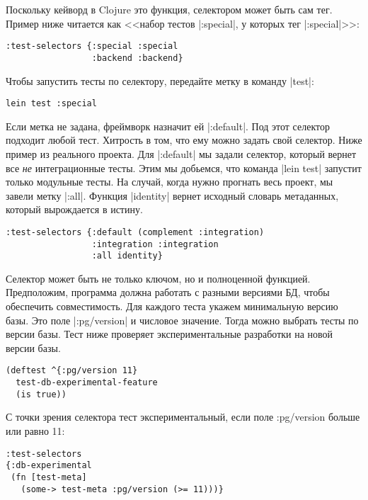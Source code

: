 Поскольку кейворд в Clojure это функция, селектором может быть сам тег. Пример
ниже читается как <<набор тестов \spverb|:special|, у которых тег
\spverb|:special|>>:

\begin{verbatim}
:test-selectors {:special :special
                 :backend :backend}
\end{verbatim}

Чтобы запустить тесты по селектору, передайте метку в команду \spverb|test|:

\begin{verbatim}
lein test :special
\end{verbatim}

Если метка не задана, фреймворк назначит ей \spverb|:default|. Под этот селектор
подходит любой тест. Хитрость в том, что ему можно задать свой селектор. Ниже
пример из реального проекта. Для \spverb|:default| мы задали селектор, который
вернет все \emph{не} интеграционные тесты. Этим мы добьемся, что команда
\spverb|lein test| запустит только модульные тесты. На случай, когда нужно
прогнать весь проект, мы завели метку \spverb|:all|. Функция \spverb|identity|
вернет исходный словарь метаданных, который вырождается в истину.

\begin{verbatim}
:test-selectors {:default (complement :integration)
                 :integration :integration
                 :all identity}
\end{verbatim}


Селектор может быть не только ключом, но и полноценной функцией. Предположим,
программа должна работать с разными версиями БД, чтобы обеспечить
совместимость. Для каждого теста укажем минимальную версию базы. Это поле
\spverb|:pg/version| и числовое значение. Тогда можно выбрать тесты по версии
базы. Тест ниже проверяет экспериментальные разработки на новой версии базы.

\begin{verbatim}
(deftest ^{:pg/version 11}
  test-db-experimental-feature
  (is true))
\end{verbatim}

С точки зрения селектора тест экспериментальный, если поле :pg/version больше
или равно 11:

\begin{verbatim}
:test-selectors
{:db-experimental
 (fn [test-meta]
   (some-> test-meta :pg/version (>= 11)))}
\end{verbatim}


